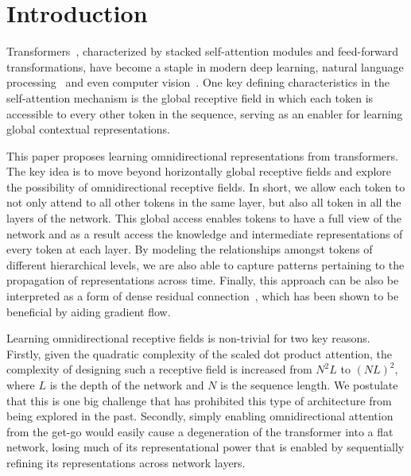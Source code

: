 \documentclass{article}
\begin{document}
\section{Introduction}
 Transformers~\citep{vaswani2017attention}, characterized by stacked self-attention modules and feed-forward transformations, have become a staple in modern deep learning, natural language processing~\citep{devlin2018bert,raffel2019exploring} and even computer vision~\citep{dosovitskiy2020image}. 
 One key defining characteristics in the self-attention mechanism is the global receptive field in which each token is accessible to every other token in the sequence, serving as an enabler for learning global contextual representations.
 
 This paper proposes learning omnidirectional representations from transformers. The key idea is to move beyond horizontally global receptive fields and explore the possibility of omnidirectional receptive fields. In short, we allow each token to not only attend to all other tokens in the same layer, but also all token in all the layers of the network. This global access enables tokens to have a full view of the network and as a result access the knowledge and intermediate representations of every token at each layer. 
 By modeling the relationships amongst tokens of different hierarchical levels, we are also able to capture patterns pertaining to the propagation of representations across time. Finally, this approach can be also be interpreted as a form of dense residual connection~\citep{huang2017densely}, which has been shown to be beneficial by aiding gradient flow.

 
Learning omnidirectional receptive fields is non-trivial for two key reasons. 
Firstly, given the quadratic complexity of the scaled dot product attention, the complexity of designing such a receptive field is increased from $N^2L$ to $(NL)^2$, where $L$ is the depth of the network and $N$ is the sequence length. We postulate that this is one big challenge that has prohibited this type of architecture from being explored in the past. 
Secondly, simply enabling omnidirectional attention from the get-go would easily cause a degeneration of the transformer into a flat network, losing much of its representational power that is enabled by sequentially refining its representations across network layers.
\end{document}
